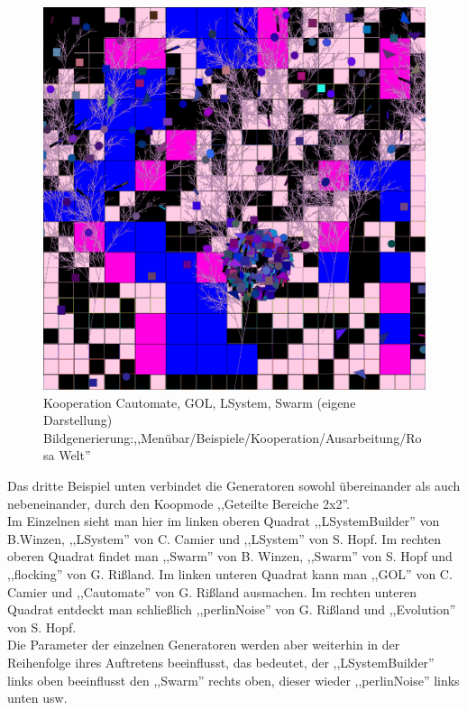 \documentclass[../mciAusarbeitung.tex]{subfiles}
\begin{document}
		\begin{figure}[H]
			\centering
			\includegraphics[width=0.8\linewidth]{img/rosaWelt.png}
			\caption[Rosa Welt]{Kooperation Cautomate, GOL, LSystem, Swarm (eigene Darstellung)\\
			Bildgenerierung:,,Menübar/Beispiele/Kooperation/Ausarbeitung/Rosa Welt''}
		\end{figure}
	\noindent Das dritte Beispiel unten verbindet die Generatoren sowohl übereinander als auch nebeneinander, durch den Koopmode ,,Geteilte Bereiche 2x2''.\\
	 Im Einzelnen sieht man hier im linken oberen Quadrat ,,LSystemBuilder'' von B.Winzen, ,,LSystem'' von C. Camier und ,,LSystem'' von S. Hopf. Im rechten oberen Quadrat findet man ,,Swarm'' von B. Winzen, ,,Swarm'' von S. Hopf und ,,flocking'' von G. Rißland. Im linken unteren Quadrat kann man ,,GOL'' von C. Camier und ,,Cautomate'' von G. Rißland ausmachen. Im rechten unteren Quadrat entdeckt man schließlich ,,perlinNoise'' von G. Rißland und ,,Evolution'' von S. Hopf.\\
	Die Parameter der einzelnen Generatoren werden aber weiterhin in der Reihenfolge ihres Auftretens beeinflusst, das bedeutet, der ,,LSystemBuilder'' links oben beeinflusst den ,,Swarm'' rechts oben, dieser wieder ,,perlinNoise'' links unten usw.\\
\end{document}

